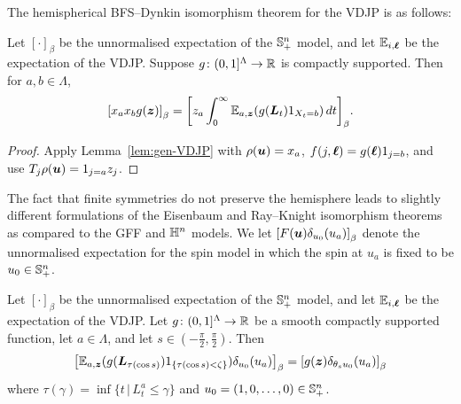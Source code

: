 \documentclass[11pt,a4paper]{article}
\begin{document}
The hemispherical BFS--Dynkin isomorphism theorem for the VDJP
is as follows:

\begin{theorem}
  \label{thm:BHS-hemi}
  Let $[\cdot]_\beta$ be the unnormalised expectation of the
  ${\mathbb S}_+^n$ model, and let $\mathbb{E}_{i,\boldsymbol{\ell}}$ be the expectation of
  the VDJP.  Suppose $g\colon (0,1]^{\Lambda} \to \mathbb{R}$ is compactly
  supported. Then for $a,b\in\Lambda$,
  \begin{equation}
    \label{eq:BHS-hemi}
      \uspin{x_{a}x_{b}
        g(\V{z})}_{\beta} =
      \uspin{z_{a}\int_{0}^{\infty} \E_{a,\V{z}}(g(\V{L}_{t})1_{X_t = b})\,dt}_{\beta}.
  \end{equation}
\end{theorem}
\begin{proof}
  Apply Lemma~\ref{lem:gen-VDJP} with $\rho(\boldsymbol{u}) = x_a$,
  $f(j,\boldsymbol{\ell}) = g(\boldsymbol{\ell})1_{j=b}$, and use 
  $T_j\rho(\boldsymbol{u}) = 1_{j=a} z_j$.
\end{proof}
The fact that finite symmetries do not preserve the hemisphere leads
to slightly different formulations of the Eisenbaum and Ray--Knight
isomorphism theorems as compared to the GFF and $\mathbb{H}^{n}$ models.  We
let $\cb{F(\V{u}) \delta_{u_{0}}(u_{a})}_{\beta}$ denote the
unnormalised expectation for the spin model in which the spin at
$u_{a}$ is fixed to be $u_{0}\in{\ensuremath{\mathbb S}}^{n}_{+}$.
\begin{theorem}
  \label{thm:RK-VDJP}
  Let $[\cdot]_\beta$ be the unnormalised expectation of the
  ${\mathbb S}_+^n$ model, and let $\mathbb{E}_{i,\boldsymbol{\ell}}$ be the expectation of
  the VDJP.  Let $g\colon(0,1]^{\Lambda}\to \mathbb{R}$ be a smooth compactly supported function, let $a\in\Lambda$, and let
  $s\in(-\frac{\pi}{2},\frac{\pi}{2})$.  Then
  \begin{equation}
    \uspin{
      \E_{a,\V{z}}(g(\bm{L}_{\tau(\cos{s})})1_{\{\tau{(\cos{s})} <
        \zeta\}})\delta_{u_{0}}(u_a)}_\beta
    = \uspin{ g(\bm{z})\delta_{\theta_{s}u_0}(u_a)}_\beta
  \end{equation}
  where $\tau(\gamma) = \inf \{t \,| \,L_t^a \le \gamma\}$ and
  $u_0=(1,0,\dots,0) \in {\ensuremath{\mathbb S}}^n_+$.
\end{theorem}
\end{document}
